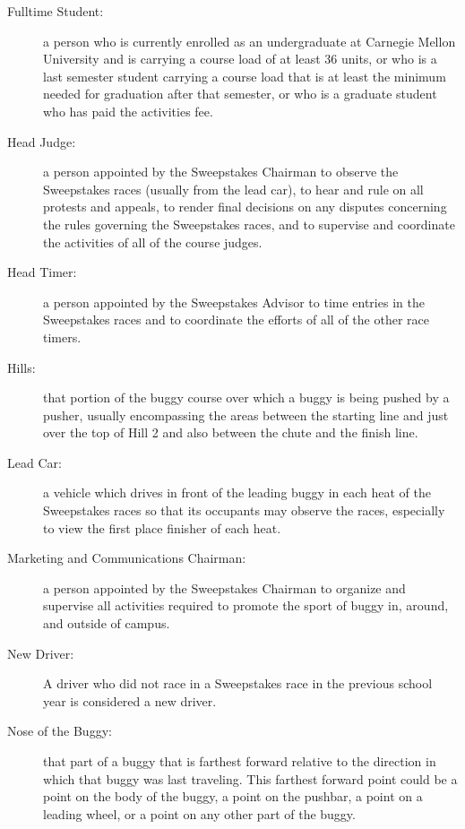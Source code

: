 \begin{description}
	\item[Fulltime Student:]
	a person who is currently enrolled as an undergraduate at Carnegie Mellon University and is carrying a course load of at least 36 units, or who is a last semester student carrying a course load that is at least the minimum needed for graduation after that semester, or who is a graduate student who has paid the activities fee.

	\item[Head Judge:]
	a person appointed by the Sweepstakes Chairman to observe the Sweepstakes races (usually from the lead car), to hear and rule on all protests and appeals, to render final decisions on any disputes concerning the rules governing the Sweepstakes races, and to supervise and coordinate the activities of all of the course judges.

	\item[Head Timer:]
	a person appointed by the Sweepstakes Advisor to time entries in the Sweepstakes races and to coordinate the efforts of all of the other race timers.

	\item[Hills:]
	that portion of the buggy course over which a buggy is being pushed by a pusher, usually encompassing the areas between the starting line and just over the top of Hill 2 and also between the chute and the finish line.

	\item[Lead Car:]
	a vehicle which drives in front of the leading buggy in each heat of the Sweepstakes races so that its occupants may observe the races, especially to view the first place finisher of each heat.

	\item[Marketing and Communications Chairman:]
	a person appointed by the Sweepstakes Chairman to organize and supervise all activities required to promote the sport of buggy in, around, and outside of campus. 

	\item [New Driver:] 
	A driver who did not race in a Sweepstakes race in the previous school year is considered a new driver.

	\item[Nose of the Buggy:]
	that part of a buggy that is farthest forward relative to the direction in which that buggy was last traveling. This farthest forward point could be a point on the body of the buggy, a point on the pushbar, a point on a leading wheel, or a point on any other part of the buggy.


\end{description}
